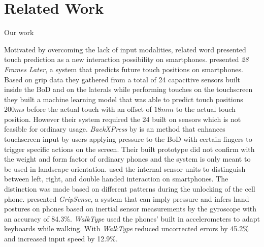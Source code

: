 \section{Related Work}
\label{sec:relw}
Our work 

Motivated by overcoming the lack of input modalities, related word presented touch prediction as a new interaction possibility on smartphones.
\citeauthor{MohdNoor2016} \cite{MohdNoor2016} presented \textit{28 Frames Later}, a system that predicts future touch positions on smartphones. 
Based on grip data they gathered from a total of 24 capacitive sensors built inside the BoD and on the laterals while performing touches on the touchscreen they built a machine learning model that was able to predict touch positions $ 200ms $ before the actual touch with an offset of $ 18mm $ to the actual touch position.
However their system required the 24 built on sensors which is not feasible for ordinary usage.
\textit{BackXPress} by \citeauthor{Corsten2017} \cite{Corsten2017} is an method that enhances touchscreen input by users applying pressure to the BoD with certain fingers to trigger specific actions on the screen.
Their built prototype did not confirm with the weight and form factor of ordinary phones and the system is only meant to be used in landscape orientation.
\citeauthor{Lochtefeld2015} \cite{Lochtefeld2015} used the internal sensor units to distinguish between left, right, and double handed interaction on smartphones. 
The distinction was made based on different patterns during the unlocking of the cell phone. 
\citeauthor{Goel2012a} \cite{Goel2012a} presented \textit{GripSense}, a system that can imply pressure and infers hand postures on phones based on inertial sensor measurements by the gyroscope with an accuracy of 84.3\%.
\textit{WalkType} \cite{Goel2012} used the phones' built in accelerometers to adapt keyboards while walking. With \textit{WalkType} reduced uncorrected errors by 45.2\% and increased input speed by 12.9\%.

